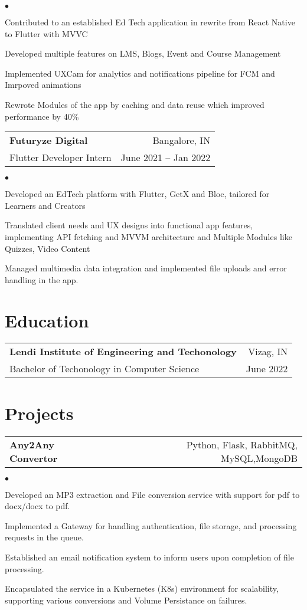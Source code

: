 \documentclass[margin, 11pt]{res}
\makeatletter
\newcommand{\resumeSubheading}[4]{

\begin{tabular*}{1.01\textwidth}{@{\hspace{-4pt}}l @{\extracolsep{\fill}} r}
\textbf{#1} & #2 \\
      {#3} &  {#4}
\end{tabular*}\vspace{-2pt}
}
\newcommand{\resumeSubSubheading}[2]{
\begin{tabular*}{1.01\textwidth}{@{\hspace{-4pt}}l @{\extracolsep{\fill}} r}
    #1 & #2 
\end{tabular*}\vspace{-7pt}
}
\newenvironment{list2}{
	\begin{list}{$\bullet$}{%
	    \small
		\setlength{\itemsep}{0in}
		\setlength{\parsep}{0in} \setlength{\parskip}{0in}
		\setlength{\topsep}{0in} \setlength{\partopsep}{0in}
		\setlength{\leftmargin}{0.2in}}}{\end{list}}
\makeatother
\begin{document}
\begin{resume}
\begin{list2}
\item{Contributed to an established Ed Tech application in rewrite from React Native to Flutter with MVVC}
\item{Developed multiple features on LMS, Blogs, Event and Course Management}
\item{Implemented UXCam for analytics and notifications pipeline for FCM and Imrpoved animations}
\item{Rewrote Modules of the app by caching and data reuse which improved performance by 40\%}
\end{list2}

\resumeSubheading{{\bf Futuryze Digital}}{Bangalore, IN}
                 {Flutter Developer Intern}{June 2021 -- Jan 2022}

\begin{list2}
\item{Developed an EdTech platform with Flutter, GetX and Bloc, tailored for Learners and Creators }
\item{Translated client needs and UX designs into functional app features, implementing API fetching and MVVM architecture and Multiple Modules like Quizzes, Video Content }
\item{Managed multimedia data integration and implemented file uploads and error handling in the app. }
\end{list2}


\section{\sc Education}

\vspace{2pt}

\resumeSubheading{Lendi Institute of Engineering and Techonology}{Vizag, IN}
             {Bachelor of Techonology in Computer Science}{June 2022}

\section{\sc Projects}

\resumeSubSubheading{\textbf{Any2Any Convertor}}
{Python, Flask, RabbitMQ, MySQL,MongoDB}

\begin{list2}
\item {Developed an MP3 extraction and File conversion service with support for pdf to docx/docx to pdf.}
        \item {Implemented a Gateway for handling authentication, file storage, and processing requests in the queue.}
        \item {Established an email notification system to inform users upon completion of file processing.}
        \item {Encapsulated the service in a Kubernetes (K8s) environment for scalability, supporting various conversions and Volume Persistance on failures.}
\end{list2}


\end{resume}
\end{document}
